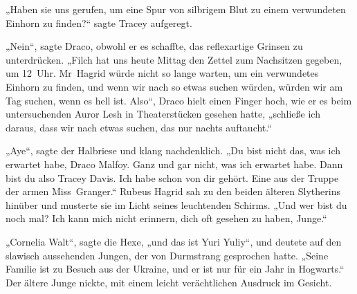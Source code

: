 „Haben sie uns gerufen, um eine Spur von silbrigem Blut zu einem verwundeten Einhorn zu finden?“ sagte Tracey aufgeregt.

„Nein“, sagte Draco, obwohl er es schaffte, das reflexartige Grinsen zu unterdrücken.
„Filch hat uns heute Mittag den Zettel zum Nachsitzen gegeben, um 12~Uhr. Mr~Hagrid würde nicht so lange warten, um ein verwundetes Einhorn zu finden, und wenn wir nach so etwas suchen würden, würden wir am Tag suchen, wenn es hell ist. Also“, Draco hielt einen Finger hoch, wie er es beim untersuchenden Auror Lesh in Theaterstücken gesehen hatte, „schließe ich daraus, dass wir nach etwas suchen, das nur nachts auftaucht.“

„Aye“, sagte der Halbriese und klang nachdenklich.
„Du bist nicht das, was ich erwartet habe, Draco Malfoy. Ganz und gar nicht, was ich erwartet habe. Dann bist du also Tracey Davis. Ich habe schon von dir gehört. Eine aus der Truppe der armen Miss~Granger.“ Rubeus Hagrid sah zu den beiden älteren Slytherins hinüber und musterte sie im Licht seines leuchtenden Schirms.
„Und wer bist du noch mal? Ich kann mich nicht erinnern, dich oft gesehen zu haben, Junge.“

„Cornelia Walt“, sagte die Hexe, „und das ist Yuri Yuliy“, und deutete auf den slawisch aussehenden Jungen, der von Durmstrang gesprochen hatte.
„Seine Familie ist zu Besuch aus der Ukraine, und er ist nur für ein Jahr in Hogwarts.“
Der ältere Junge nickte, mit einem leicht verächtlichen Ausdruck im Gesicht.

